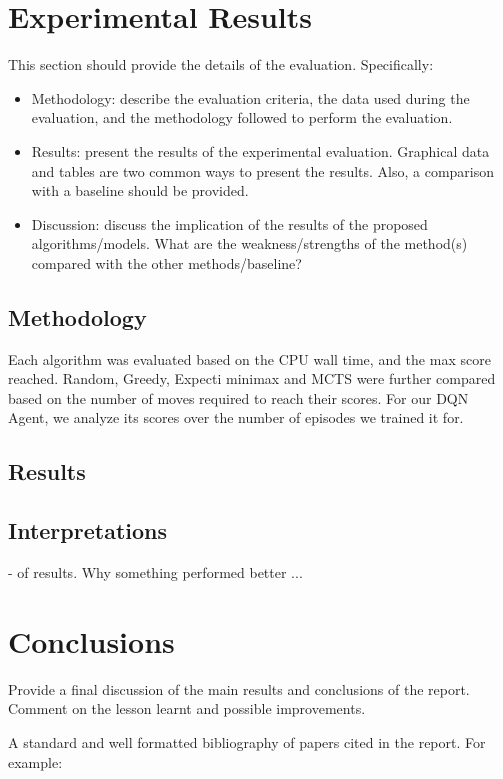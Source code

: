 \documentclass{svproc}
\begin{document}
    \section{Experimental Results}
    This section should provide the details of the evaluation. Specifically:
    \begin{itemize}
        \item Methodology: describe the evaluation criteria, the data used during the evaluation, and the methodology followed to perform the evaluation.
        \item Results: present the results of the experimental evaluation. Graphical data and tables are two common ways to present the results. Also, a comparison with a baseline should be provided.
        \item Discussion: discuss the implication of the results of the proposed algorithms/models. What are the weakness/strengths of the method(s) compared with the other methods/baseline?
    \end{itemize}
    	
		\subsection{Methodology}
		Each algorithm was evaluated based on the CPU wall time, and the max score reached. Random, Greedy, Expecti minimax and MCTS were further compared based on the number of moves required to reach their scores. For our DQN Agent, we analyze its scores over the number of episodes we trained it for.

		\subsection{Results}
		
		\subsection{Interpretations}
			- of results. Why something performed better ...
    \section{Conclusions}
    Provide a final discussion of the main results and conclusions of the report. Comment on the lesson learnt and possible improvements.


    A standard\cite{test1} and well formatted bibliography of papers cited in the report. For example\cite{test2}:

    
    
\end{document}
